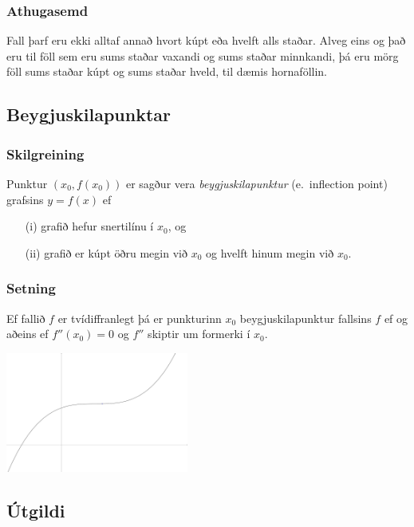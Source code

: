 \documentclass[icelandic,a4paper,12pt]{article}
\begin{document}
\subsubsection{Athugasemd}
Fall þarf eru ekki alltaf annað hvort kúpt eða hvelft alls staðar. Alveg eins og 
það eru til föll sem eru sums staðar vaxandi og sums staðar minnkandi, þá eru mörg föll
sums staðar kúpt og sums staðar hveld, til dæmis hornaföllin.

\subsection{Beygjuskilapunktar}
\subsubsection{Skilgreining}  
Punktur $(x_0, f(x_0))$ er sagður vera {\em beygjuskilapunktur}
(e.~inflection point) grafsins $y=f(x)$ ef \pause
\begin{enumerate}[(i)]
\item[(i)] grafið hefur snertilínu í $x_0$, og \pause
\item[(ii)] grafið er kúpt öðru megin við $x_0$ og hvelft hinum megin
  við $x_0$.
\end{enumerate}

\pause


\subsubsection{Setning}
Ef fallið $f$ er tvídiffranlegt þá er punkturinn $x_0$ 
beygjuskilapunktur fallsins $f$ ef og aðeins ef \pause
$f''(x_0) =0$ og $f''$ skiptir um formerki í $x_0$.
 
\begin{center}
\includegraphics[width=6cm,keepaspectratio=true]{./myndir/kafli05/05_beygjuskilapunktur.png}
\end{center}



\subsection{Útgildi}
\end{document}
